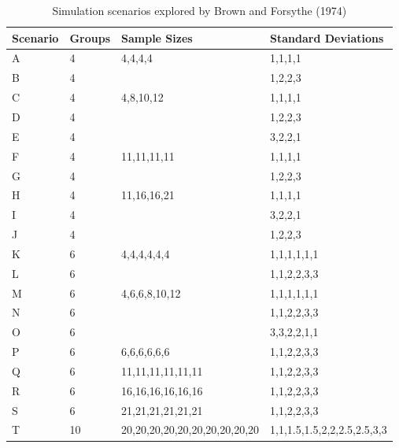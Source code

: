 \documentclass[
]{book}
\begin{document}
\begin{table}
\centering
\caption{\label{tab:BF-Scenarios}Simulation scenarios explored by Brown and Forsythe (1974)}
\centering
\begin{tabular}[t]{l|l|l|l}
\hline
Scenario & Groups & Sample Sizes & Standard Deviations\\
\hline
A & 4 & 4,4,4,4 & 1,1,1,1\\
\hline
B & 4 &  & 1,2,2,3\\
\hline
C & 4 & 4,8,10,12 & 1,1,1,1\\
\hline
D & 4 &  & 1,2,2,3\\
\hline
E & 4 &  & 3,2,2,1\\
\hline
F & 4 & 11,11,11,11 & 1,1,1,1\\
\hline
G & 4 &  & 1,2,2,3\\
\hline
H & 4 & 11,16,16,21 & 1,1,1,1\\
\hline
I & 4 &  & 3,2,2,1\\
\hline
J & 4 &  & 1,2,2,3\\
\hline
K & 6 & 4,4,4,4,4,4 & 1,1,1,1,1,1\\
\hline
L & 6 &  & 1,1,2,2,3,3\\
\hline
M & 6 & 4,6,6,8,10,12 & 1,1,1,1,1,1\\
\hline
N & 6 &  & 1,1,2,2,3,3\\
\hline
O & 6 &  & 3,3,2,2,1,1\\
\hline
P & 6 & 6,6,6,6,6,6 & 1,1,2,2,3,3\\
\hline
Q & 6 & 11,11,11,11,11,11 & 1,1,2,2,3,3\\
\hline
R & 6 & 16,16,16,16,16,16 & 1,1,2,2,3,3\\
\hline
S & 6 & 21,21,21,21,21,21 & 1,1,2,2,3,3\\
\hline
T & 10 & 20,20,20,20,20,20,20,20,20,20 & 1,1,1.5,1.5,2,2,2.5,2.5,3,3\\
\hline
\end{tabular}
\end{table}
\end{document}
